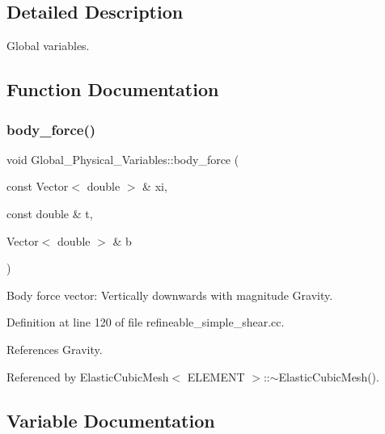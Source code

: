 \subsection{Detailed Description}
Global variables. 

\subsection{Function Documentation}
\mbox{\label{namespaceGlobal__Physical__Variables_a055c27a8d2375f73e74970a8ea1dee21}} 
\subsubsection{\texorpdfstring{body\+\_\+force()}{body\_force()}}
{\footnotesize\ttfamily void Global\+\_\+\+Physical\+\_\+\+Variables\+::body\+\_\+force (\begin{DoxyParamCaption}\item[{const Vector$<$ double $>$ \&}]{xi,  }\item[{const double \&}]{t,  }\item[{Vector$<$ double $>$ \&}]{b }\end{DoxyParamCaption})}



Body force vector\+: Vertically downwards with magnitude Gravity. 



Definition at line 120 of file refineable\+\_\+simple\+\_\+shear.\+cc.



References Gravity.



Referenced by Elastic\+Cubic\+Mesh$<$ E\+L\+E\+M\+E\+N\+T $>$\+::$\sim$\+Elastic\+Cubic\+Mesh().



\subsection{Variable Documentation}
\mbox{\label{namespaceGlobal__Physical__Variables_a849754fa7155c1a31481674ce4845658}} 
